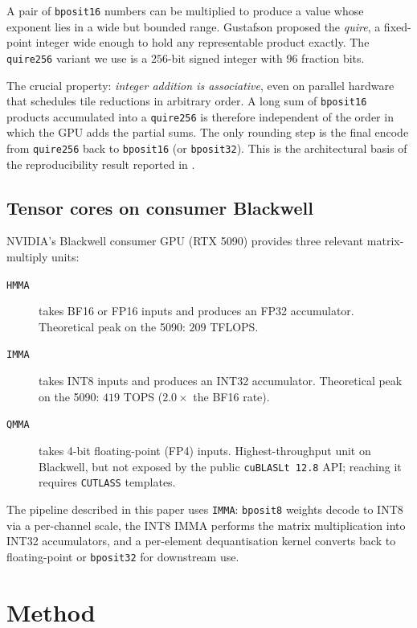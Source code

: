 \documentclass[11pt,a4paper]{article}
\newcommand{\bpsixteen}{\texttt{bposit16}}
\newcommand{\bpeight}{\texttt{bposit8}}
\newcommand{\bpthirtytwo}{\texttt{bposit32}}
\newcommand{\quireTSF}{\texttt{quire256}}
\newcommand{\TFLOPS}{\textsf{TFLOPS}}
\newcommand{\TOPS}{\textsf{TOPS}}
\begin{document}
A pair of \bpsixteen{} numbers can be multiplied to produce a value
whose exponent lies in a wide but bounded range. Gustafson proposed
the \emph{quire}, a fixed-point integer wide enough to hold any
representable product exactly. The \quireTSF{} variant we use is a
$256$-bit signed integer with $96$ fraction bits.

The crucial property: \emph{integer addition is associative}, even on
parallel hardware that schedules tile reductions in arbitrary order.
A long sum of \bpsixteen{} products accumulated into a \quireTSF{} is
therefore independent of the order in which the GPU adds the partial
sums. The only rounding step is the final encode from \quireTSF{} back
to \bpsixteen{} (or \bpthirtytwo{}). This is the architectural basis
of the reproducibility result reported in .

\subsection{Tensor cores on consumer Blackwell}

NVIDIA's Blackwell consumer GPU (RTX 5090) provides three relevant
matrix-multiply units:

\begin{description}
    \item[\texttt{HMMA}] takes BF16 or FP16 inputs and produces an FP32
          accumulator. Theoretical peak on the 5090: $209$ \TFLOPS{}.
    \item[\texttt{IMMA}] takes INT8 inputs and produces an INT32
          accumulator. Theoretical peak on the 5090: $419$ \TOPS{}
          ($2.0\times$ the BF16 rate).
    \item[\texttt{QMMA}] takes 4-bit floating-point (FP4) inputs.
          Highest-throughput unit on Blackwell, but not exposed by the
          public \texttt{cuBLASLt 12.8} API; reaching it requires
          \texttt{CUTLASS} templates.
\end{description}

The pipeline described in this paper uses \texttt{IMMA}: \bpeight{}
weights decode to INT8 via a per-channel scale, the INT8 IMMA performs
the matrix multiplication into INT32 accumulators, and a per-element
dequantisation kernel converts back to floating-point or
\bpthirtytwo{} for downstream use.

\section{Method}
\label{sec:method}
\end{document}
